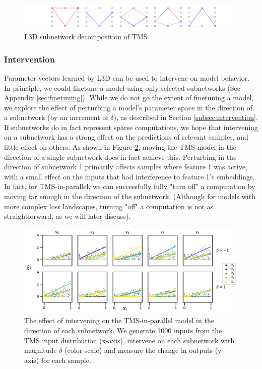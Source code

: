 \documentclass{article}
\theoremstyle{plain}
\theoremstyle{definition}
\theoremstyle{remark}
\begin{document}
\begin{figure}
    \centerline{\includegraphics[width=\textwidth]{../figures/3_tms_first_5_subnetworks.pdf}}
    \centering
    \caption{L3D subnetwork decomposition of TMS}\label{fig:3_tms_subnetworks_first5}
\end{figure}


\subsubsection{Intervention}

Parameter vectors learned by L3D can be used to intervene on model behavior. In principle, we could finetune a model using only selected subnetworks (See Appendix \ref{sec:finetuning}). While we do not go the extent of finetuning a model, we explore the effect of perturbing a model's parameter space in the direction of a subnetwork (by an increment of $\delta$), as described in Section \ref{subsec:intervention}. If subnetworks do in fact represent sparse computations, we hope that intervening on a subnetwork has a strong effect on the predictions of relevant samples, and little effect on others. As shown in Figure \ref{fig:4_tms_intervention}, moving the TMS model in the direction of a single subnetwork does in fact achieve this. Perturbing in the direction of subnetwork 1 primarily affects samples where feature 1 was active, with a small effect on the inputs that had interference to feature 1's embeddings. In fact, for TMS-in-parallel, we can successfully fully "turn off" a computation by moving far enough in the direction of the subnetwork. (Although for models with more complex loss landscapes, turning "off" a computation is not as straightforward, as we will later discuss).

\begin{figure}
    \centerline{\includegraphics[width=\columnwidth]{../figures/4_tms_intervention.pdf}}
    \centering
    \caption{The effect of intervening on the TMS-in-parallel model in the direction of each subnetwork. We generate 1000 inputs from the TMS input distribution (x-axis), intervene on each subnetwork with magnitude $\delta$ (color scale) and measure the change in outputs (y-axis) for each sample.}\label{fig:4_tms_intervention}
\end{figure}
\end{document}
